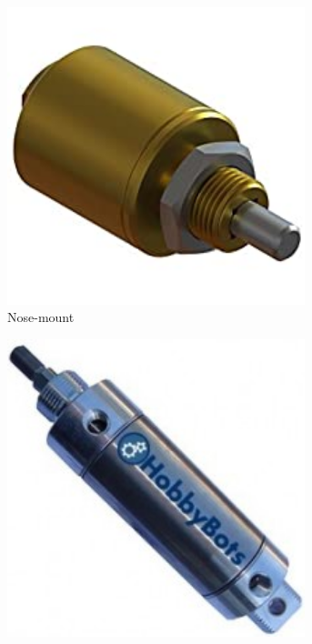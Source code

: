 \begin{figure}[H]
	\begin{subfigure}[b]{.24\linewidth}
		\includegraphics[width=0.95\textwidth]{imgs/piston_nosemount.jpeg}
		\caption{Nose-mount}
	\end{subfigure}
	\begin{subfigure}[b]{.24\linewidth}
		\includegraphics[width=0.95\textwidth]{imgs/piston_universal.png}

\end{subfigure}
\end{figure}
